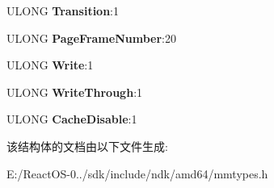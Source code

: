 \begin{DoxyCompactItemize}
\item 
\mbox{\label{struct___m_m_p_t_e___t_r_a_n_s_i_t_i_o_n_a84fbc88a7982975658bb5d4d0f4d434b}} 
U\+L\+O\+NG {\bfseries Transition}\+:1
\item 
\mbox{\label{struct___m_m_p_t_e___t_r_a_n_s_i_t_i_o_n_aa82d63685ce993fb0c4f7820670353d1}} 
U\+L\+O\+NG {\bfseries Page\+Frame\+Number}\+:20
\item 
\mbox{\label{struct___m_m_p_t_e___t_r_a_n_s_i_t_i_o_n_aca8da3978e66451c232a7303e9ea7a6d}} 
U\+L\+O\+NG {\bfseries Write}\+:1
\item 
\mbox{\label{struct___m_m_p_t_e___t_r_a_n_s_i_t_i_o_n_a616916edf15f5bec11d233038b99c498}} 
U\+L\+O\+NG {\bfseries Write\+Through}\+:1
\item 
\mbox{\label{struct___m_m_p_t_e___t_r_a_n_s_i_t_i_o_n_a9b8c1cf147a9ed7971eaef6fbe9e5fdc}} 
U\+L\+O\+NG {\bfseries Cache\+Disable}\+:1
\end{DoxyCompactItemize}


该结构体的文档由以下文件生成\+:\begin{DoxyCompactItemize}
\item 
E\+:/\+React\+O\+S-\/0../sdk/include/ndk/amd64/mmtypes.\+h\end{DoxyCompactItemize}
